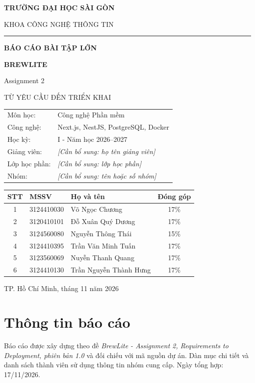\documentclass[12pt,a4paper]{article}
\newcommand{\canbosung}[1]{\textit{[Cần bổ sung: #1]}}
\newcommand{\TenNhom}{\canbosung{tên hoặc số nhóm}}
\newcommand{\LopHoc}{\canbosung{lớp học phần}}
\newcommand{\GiangVien}{\canbosung{họ tên giảng viên}}
\begin{document}
\hypersetup{pageanchor=false}
\begin{titlepage}
\centering
{\large\bfseries TRƯỜNG ĐẠI HỌC SÀI GÒN\par}
{\large KHOA CÔNG NGHỆ THÔNG TIN\par}
\vspace{0.7cm}
\rule{0.7\textwidth}{0.6pt}\par
\vspace{1.1cm}
{\Large\bfseries BÁO CÁO BÀI TẬP LỚN\par}
\vspace{0.4cm}
{\Huge\bfseries\color{muc} BREWLITE\par}
\vspace{0.35cm}
{\LARGE Assignment 2\par}
\vspace{0.35cm}
{\Large TỪ YÊU CẦU ĐẾN TRIỂN KHAI\par}
\vspace{0.8cm}
\begin{tabular}{ll}
Môn học: & Công nghệ Phần mềm\\
Công nghệ: & Next.js, NestJS, PostgreSQL, Docker\\
Học kỳ: & I - Năm học 2026--2027\\
Giảng viên: & \GiangVien\\
Lớp học phần: & \LopHoc\\
Nhóm: & \TenNhom
\end{tabular}
\vspace{0.8cm}
\begin{tabularx}{\textwidth}{c l Y c}
\toprule
\textbf{STT} & \textbf{MSSV} & \textbf{Họ và tên} & \textbf{Đóng góp}\\
 & 3124410030 & Võ Ngọc Chương & 17\%\\
2 & 3120410101 & Đỗ Xuân Quý Dương & 17\%\\
3 & 3124560080 & Nguyễn Thông Thái & 15\%\\
4 & 3124410395 & Trần Văn Minh Tuấn & 17\%\\
5 & 3123560069 & Nuyễn Thanh Quang & 17\%\\
6 & 3124410130 & Trần Nguyễn Thành Hưng & 17\%\\
\bottomrule
\end{tabularx}
\vfill
{TP. Hồ Chí Minh, tháng 11 năm 2026\par}
\end{titlepage}
\hypersetup{pageanchor=true}

\section*{Thông tin báo cáo}
Báo cáo được xây dựng theo đề \textit{BrewLite - Assignment 2, Requirements to Deployment, phiên bản 1.0} và đối chiếu với mã nguồn dự án. Dàn mục chi tiết và danh sách thành viên sử dụng thông tin nhóm cung cấp. Ngày tổng hợp: 17/11/2026.
\end{document}
